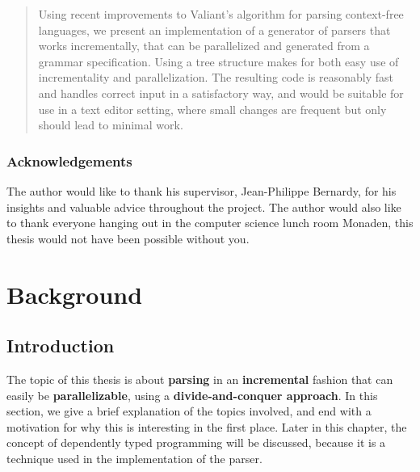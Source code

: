 \documentclass[a4paper,12pt,twosided]{report}
\begin{document}


\begin{abstract}
Using recent improvements to Valiant's algorithm for parsing context-free
languages, we present an implementation of a generator of parsers that works
incrementally, that can be parallelized and generated from a grammar
specification. Using a tree structure makes for both easy use of incrementality
and parallelization.  The resulting code is reasonably fast and handles correct
input in a satisfactory way, and would be suitable for use in a text editor
setting, where small changes are frequent but only should lead to minimal work.
\end{abstract}

\thispagestyle{empty}
\subsection*{Acknowledgements}
The author would like to thank his supervisor, Jean-Philippe Bernardy, for his
insights and valuable advice throughout the project. The author would also like
to thank everyone hanging out in the computer science lunch room Monaden, this
thesis would not have been possible without you. 

\setcounter{page}{0}
\tableofcontents

%
%

\chapter{Background}

\section{Introduction}
The topic of this thesis is about \textbf{parsing} in an \textbf{incremental}
fashion that can easily be \textbf{parallelizable}, using a
\textbf{divide-and-conquer approach}. In this section, we give a brief
explanation of the topics involved, and end with a motivation for why this is
interesting in the first place. Later in this chapter, the concept of
dependently typed programming will be discussed, because it is a technique used
in the implementation of the parser.
\end{document}
